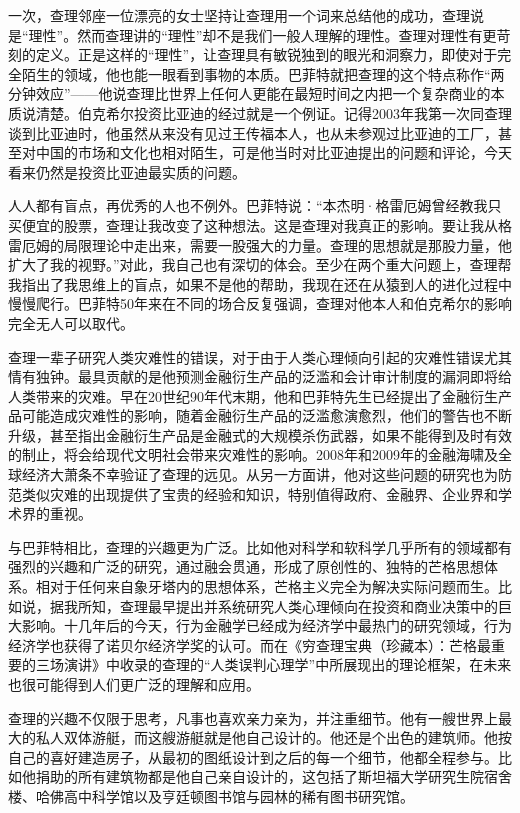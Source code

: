 一次，查理邻座一位漂亮的女士坚持让查理用一个词来总结他的成功，查理说是“理性”。然而查理讲的“理性”却不是我们一般人理解的理性。查理对理性有更苛刻的定义。正是这样的“理性”，让查理具有敏锐独到的眼光和洞察力，即使对于完全陌生的领域，他也能一眼看到事物的本质。巴菲特就把查理的这个特点称作“两分钟效应”——他说查理比世界上任何人更能在最短时间之内把一个复杂商业的本质说清楚。伯克希尔投资比亚迪的经过就是一个例证。记得2003年我第一次同查理谈到比亚迪时，他虽然从来没有见过王传福本人，也从未参观过比亚迪的工厂，甚至对中国的市场和文化也相对陌生，可是他当时对比亚迪提出的问题和评论，今天看来仍然是投资比亚迪最实质的问题。
\par

人人都有盲点，再优秀的人也不例外。巴菲特说：“本杰明·格雷厄姆曾经教我只买便宜的股票，查理让我改变了这种想法。这是查理对我真正的影响。要让我从格雷厄姆的局限理论中走出来，需要一股强大的力量。查理的思想就是那股力量，他扩大了我的视野。”对此，我自己也有深切的体会。至少在两个重大问题上，查理帮我指出了我思维上的盲点，如果不是他的帮助，我现在还在从猿到人的进化过程中慢慢爬行。巴菲特50年来在不同的场合反复强调，查理对他本人和伯克希尔的影响完全无人可以取代。
\par

查理一辈子研究人类灾难性的错误，对于由于人类心理倾向引起的灾难性错误尤其情有独钟。最具贡献的是他预测金融衍生产品的泛滥和会计审计制度的漏洞即将给人类带来的灾难。早在20世纪90年代末期，他和巴菲特先生已经提出了金融衍生产品可能造成灾难性的影响，随着金融衍生产品的泛滥愈演愈烈，他们的警告也不断升级，甚至指出金融衍生产品是金融式的大规模杀伤武器，如果不能得到及时有效的制止，将会给现代文明社会带来灾难性的影响。2008年和2009年的金融海啸及全球经济大萧条不幸验证了查理的远见。从另一方面讲，他对这些问题的研究也为防范类似灾难的出现提供了宝贵的经验和知识，特别值得政府、金融界、企业界和学术界的重视。
\par

与巴菲特相比，查理的兴趣更为广泛。比如他对科学和软科学几乎所有的领域都有强烈的兴趣和广泛的研究，通过融会贯通，形成了原创性的、独特的芒格思想体系。相对于任何来自象牙塔内的思想体系，芒格主义完全为解决实际问题而生。比如说，据我所知，查理最早提出并系统研究人类心理倾向在投资和商业决策中的巨大影响。十几年后的今天，行为金融学已经成为经济学中最热门的研究领域，行为经济学也获得了诺贝尔经济学奖的认可。而在《穷查理宝典（珍藏本）：芒格最重要的三场演讲》中收录的查理的“人类误判心理学”中所展现出的理论框架，在未来也很可能得到人们更广泛的理解和应用。
\par

查理的兴趣不仅限于思考，凡事也喜欢亲力亲为，并注重细节。他有一艘世界上最大的私人双体游艇，而这艘游艇就是他自己设计的。他还是个出色的建筑师。他按自己的喜好建造房子，从最初的图纸设计到之后的每一个细节，他都全程参与。比如他捐助的所有建筑物都是他自己亲自设计的，这包括了斯坦福大学研究生院宿舍楼、哈佛高中科学馆以及亨廷顿图书馆与园林的稀有图书研究馆。
\par

